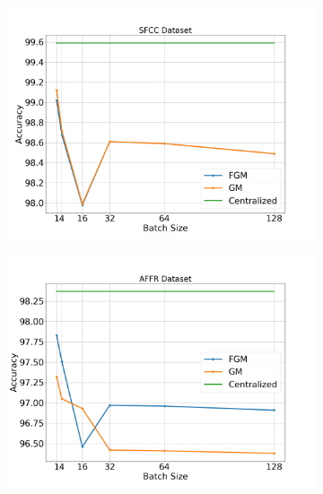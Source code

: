 \begin{figure}[H]
    \centering
    \begin{subfigure}[b]{0.45\textwidth}
        \centering
        \includegraphics[width=\textwidth]{./images/results/sfc-plots/exp_Fig_2_1.png}
        \caption{}
    \end{subfigure}
    \hfill
    \begin{subfigure}[b]{0.45\textwidth}
        \centering
        \includegraphics[width=\textwidth]{./images/results/amazon-plots/exp_Fig_2_1.png}
        \caption{}
    \end{subfigure}
    \caption{}
    \label{fig:sfcc-affr_2_1}
\end{figure}


